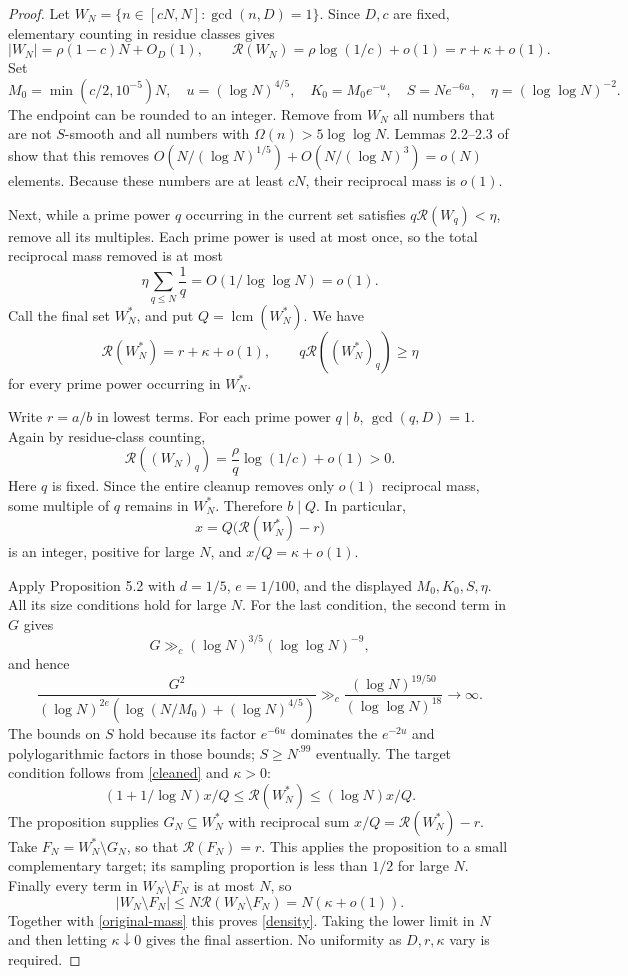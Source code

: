 \documentclass[11pt]{article}
\newcommand{\R}{\mathcal R}
\newcommand{\lcm}{\operatorname{lcm}}
\begin{document}
\begin{proof}
Let $W_N=\{n\in[cN,N]:\gcd(n,D)=1\}$.
Since $D,c$ are fixed, elementary counting in residue classes gives
\begin{equation}\label{original-mass}
 |W_N|=\rho(1-c)N+O_D(1),\qquad
 \R(W_N)=\rho\log(1/c)+o(1)=r+\kappa+o(1).
\end{equation}
Set
\[
 M_0=\min(c/2,10^{-5})N,\quad
 u=(\log N)^{4/5},\quad K_0=M_0e^{-u},\quad
 S=Ne^{-6u},\quad \eta=(\log\log N)^{-2}.
\]
The endpoint can be rounded to an integer. Remove from $W_N$ all
numbers that are not $S$-smooth and all numbers with
$\Omega(n)>5\log\log N$. Lemmas 2.2--2.3 of \cite{LS} show that this
removes $O(N/(\log N)^{1/5})+O(N/(\log N)^3)=o(N)$ elements.
Because these numbers are at least $cN$, their reciprocal mass is $o(1)$.

Next, while a prime power $q$ occurring in the current set satisfies
$q\R(W_q)<\eta$, remove all its multiples. Each prime power is used
at most once, so the total reciprocal mass removed is at most
\[
 \eta\sum_{q\le N}\frac1q=O(1/\log\log N)=o(1).
\]
Call the final set $W^*_N$, and put $Q=\lcm(W^*_N)$.
We have
\begin{equation}\label{cleaned}
 \R(W^*_N)=r+\kappa+o(1),\qquad
 q\R((W^*_N)_q)\ge\eta
\end{equation}
for every prime power occurring in $W^*_N$.

Write $r=a/b$ in lowest terms. For each prime power $q\mid b$,
$\gcd(q,D)=1$. Again by residue-class counting,
\[
 \R((W_N)_q)=\frac{\rho}{q}\log(1/c)+o(1)>0.
\]
Here $q$ is fixed. Since the entire cleanup removes only $o(1)$
reciprocal mass, some multiple of $q$ remains in $W^*_N$.
Therefore $b\mid Q$. In particular,
\[
 x=Q\bigl(\R(W^*_N)-r\bigr)
\]
is an integer, positive for large $N$, and $x/Q=\kappa+o(1)$.

Apply Proposition 5.2 with $d=1/5$, $e=1/100$, and the displayed
$M_0,K_0,S,\eta$. All its size conditions hold for large $N$.
For the last condition, the second term in $G$ gives
\[
 G\gg_{c}(\log N)^{3/5}(\log\log N)^{-9},
\]
and hence
\[
 \frac{G^2}{(\log N)^{2e}
  (\log(N/M_0)+(\log N)^{4/5})}
 \gg_c\frac{(\log N)^{19/50}}{(\log\log N)^{18}}
 \longrightarrow\infty.
\]
The bounds on $S$ hold because its factor $e^{-6u}$ dominates the
$e^{-2u}$ and polylogarithmic factors in those bounds;
$S\ge N^{.99}$ eventually. The target condition follows from
\eqref{cleaned} and $\kappa>0$:
\[
 (1+1/\log N)x/Q\le\R(W^*_N)\le(\log N)x/Q.
\]
The proposition supplies $G_N\subseteq W^*_N$ with reciprocal sum
$x/Q=\R(W^*_N)-r$. Take $F_N=W^*_N\setminus G_N$, so that
$\R(F_N)=r$. This applies the proposition to a small complementary
target; its sampling proportion is less than $1/2$ for large $N$.
Finally every term in $W_N\setminus F_N$ is at most $N$, so
\[
 |W_N\setminus F_N|
 \le N\R(W_N\setminus F_N)
 =N(\kappa+o(1)).
\]
Together with \eqref{original-mass} this proves \eqref{density}.
Taking the lower limit in $N$ and then letting $\kappa\downarrow0$
gives the final assertion. No uniformity as $D,r,\kappa$ vary is required.
\end{proof}
\end{document}
